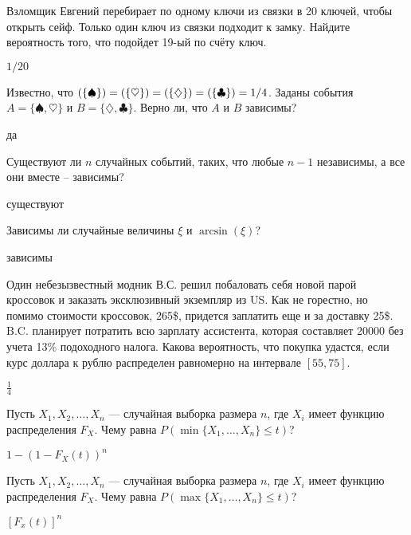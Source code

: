 \documentclass[12pt, addpoints, answers]{exam} %
\let\P\relax
\DeclareMathOperator{\P}{\mathbb{P}}
\begin{document}
\begin{questions}
\question Взломщик Евгений перебирает по одному ключи из связки в 20 ключей, чтобы открыть сейф. Только один ключ из связки подходит к замку. Найдите вероятность того, что подойдет 19-ый по счёту ключ.
\begin{solution}
 $1/20$
\end{solution}

\question Известно, что $\P(\{\spadesuit\})=\P(\{\heartsuit\})=\P(\{\diamondsuit\})=\P(\{\clubsuit\})=1/4$.  Заданы события $A=\{\spadesuit, \heartsuit\}$ и $B=\{\diamondsuit, \clubsuit\}$. Верно ли, что $A$ и $B$ зависимы?
\begin{solution}
 да
\end{solution}


\question Существуют ли $n$ случайных событий, таких, что любые $n-1$ независимы, а все они вместе -- зависимы? 
\begin{solution}
существуют
\end{solution}

\question Зависимы ли случайные величины $\xi$ и $\arcsin(\xi)$?

\begin{solution}
зависимы
\end{solution}

\question Один небезызвестный модник В.С. решил побаловать себя новой парой кроссовок и заказать эксклюзивный экземпляр из US. Как не горестно, но помимо стоимости кроссовок,  265\$, придется заплатить еще и за доставку 25\$. B.C. планирует потратить всю зарплату ассистента, которая составляет 20000 без учета 13\% подоходного налога. Какова вероятность, что покупка удастся, если курс доллара к рублю распределен равномерно на интервале $[55,75]$.

\begin{solution}
 $\frac{1}{4}$
\end{solution}


\question Пусть $X_1, X_2, \dots, X_n$ --- случайная выборка размера $n$, где $X_i$ имеет функцию распределения $F_X$. Чему равна $P(\min \{ X_1, \ldots, X_n\} \le t)$?
\begin{solution}
 $1 - (1 - F_X(t))^n$
\end{solution}


\question Пусть $X_1, X_2, \dots, X_n$ --- случайная выборка размера $n$, где $X_i$ имеет функцию распределения $F_X$. Чему равна $P(\max \{ X_1, \ldots, X_n\} \le t)$?

\begin{solution}
 $[F_x(t)]^n$
\end{solution}




\end{questions}
\end{document}
